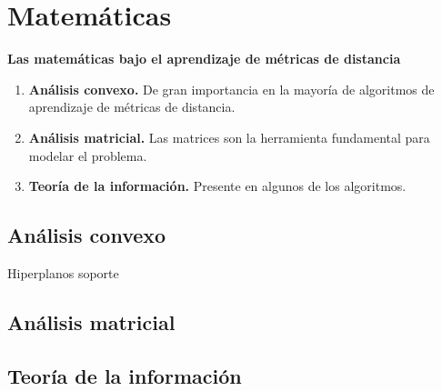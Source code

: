 \documentclass[10pt, compress]{beamer}
\begin{document}
\section{Matemáticas}


\begin{frame}

  \begin{tcolorbox}[colback=ChetwodeBlue!10,colframe=ChetwodeBlue!60]
    \begin{center}
      {\color{TurkishRose} \small\textbf{Las matemáticas bajo el aprendizaje de métricas de distancia}} \\
      \begin{enumerate}

        \item \textbf{Análisis convexo.} De gran importancia en la mayoría de algoritmos de aprendizaje de métricas de distancia.

        \item \textbf{Análisis matricial.} Las matrices son la herramienta fundamental para modelar el problema.

        \item \textbf{Teoría de la información.} Presente en algunos de los algoritmos.

        \end{enumerate}
    \end{center}
  \end{tcolorbox}

\end{frame}

\subsection{Análisis convexo}

\begin{frame}{Hiperplanos soporte}

\end{frame}

\subsection{Análisis matricial}

\subsection{Teoría de la información}
\end{document}

